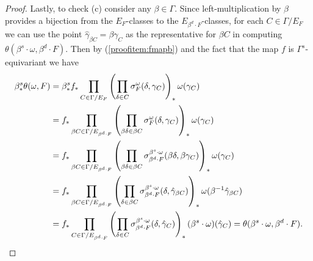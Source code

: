 \documentclass[10pt,a4paper]{amsart}
\begin{document}
\begin{proof}
	Lastly, to check (c) consider any $\beta \in \Gamma$. Since left-multiplication by $\beta$ provides a bijection from the $E_F$-classes to the $E_{\beta^d \cdot F}$-classes, for each $C \in \Gamma / E_F$ we can use the point $\widehat \gamma_{\beta C} = \beta \gamma_C$ as the representative for $\beta C$ in computing $\theta(\beta^s \cdot \omega, \beta^d \cdot F)$. Then by (\ref{proofitem:fmapb}) and the fact that the map $f$ is $\Gamma^s$-equivariant we have
	\begin{align*}
		\beta^s_* \theta(\omega, F) & = \beta^s_* f_* \prod_{C \in \Gamma / E_F} \left( \prod_{\delta \in C} \sigma_F^\omega(\delta, \gamma_C) \right)_* \omega(\gamma_C)\\
		& = f_* \prod_{\beta C \in \Gamma / E_{\beta^d \cdot F}} \left( \prod_{\beta \delta \in \beta C} \sigma_F^\omega(\delta, \gamma_C) \right)_* \omega(\gamma_C)\\
		& = f_* \prod_{\beta C \in \Gamma / E_{\beta^d \cdot F}} \left( \prod_{\beta \delta \in \beta C} \sigma_{\beta^d \cdot F}^{\beta^s \cdot \omega}(\beta \delta, \beta \gamma_C) \right)_* \omega(\gamma_C)\\
		& = f_* \prod_{\beta C \in \Gamma / E_{\beta^d \cdot F}} \left( \prod_{\delta \in \beta C} \sigma_{\beta^d \cdot F}^{\beta^s \cdot \omega}(\delta, \hat \gamma_{\beta C}) \right)_* \omega(\beta^{-1} \hat \gamma_{\beta C})\\
		& = f_* \prod_{C \in \Gamma / E_{\beta^d \cdot F}} \left( \prod_{\delta \in C} \sigma_{\beta^d \cdot F}^{\beta^s \cdot \omega}(\delta, \hat \gamma_C) \right)_* (\beta^s \cdot \omega)(\hat \gamma_C) = \theta(\beta^s \cdot \omega, \beta^d \cdot F).\qedhere
	\end{align*}
\end{proof}
\end{document}
